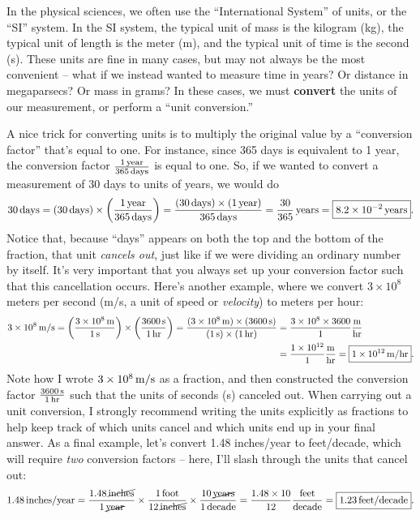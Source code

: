 \documentclass[11pt]{article}
\begin{document}
In the physical sciences, we often use the ``International System'' of units, or the ``SI'' system. In the SI system, the typical unit of mass is the kilogram (kg), the typical unit of length is the meter (m), and the typical unit of time is the second (s). These units are fine in many cases, but may not always be the most convenient -- what if we instead wanted to measure time in years? Or distance in megaparsecs? Or mass in grams? In these cases, we must \textbf{convert} the units of our measurement, or perform a ``unit conversion.''

A nice trick for converting units is to multiply the original value by a ``conversion factor'' that's equal to one. For instance, since 365 days is equivalent to 1 year, the conversion factor $\frac{1 \, {\rm year}}{365 \, {\rm days}}$ is equal to one. So, if we wanted to convert a measurement of 30 days to units of years, we would do
\medskip
\begin{equation}
    30 \, {\rm days} = (30 \, {\rm days}) \times \left(\frac{1 \, {\rm year}}{365 \, {\rm days}}\right) = \frac{(30 \, {\rm days}) \times (1 \, {\rm year})}{365 \, {\rm days}} = \frac{30}{365} \, {\rm years} = \boxed{8.2 \times 10^{-2} \, {\rm years}}.
\end{equation}
\medskip
Notice that, because ``days'' appears on both the top and the bottom of the fraction, that unit \emph{cancels out}, just like if we were dividing an ordinary number by itself. It's very important that you always set up your conversion factor such that this cancellation occurs. Here's another example, where we convert $3 \times 10^8$ meters per second (m/s, a unit of speed or \emph{velocity}) to meters per hour:
\medskip
\begin{align}
    3 \times 10^8 \, {\rm m/s} = \left(\frac{3 \times 10^8 \, {\rm m}}{1 \, {\rm s}}\right) \times \left(\frac{3600 \, {\rm s}}{1 \, {\rm hr}}\right) = \frac{(3\times 10^8 \, {\rm m}) \times (3600 \, {\rm s})}{\rm (1 \, s) \times (1 \, hr)} &= \frac{3 \times 10^8 \times 3600}{\rm 1} \frac{\rm m}{\rm hr} \nonumber \\ &= \frac{1 \times 10^{12}}{1} \frac{\rm m}{\rm hr} = \boxed{1 \times 10^{12} \, {\rm m/hr}}. 
\end{align}
\medskip 
Note how I wrote $3 \times 10^8 \, {\rm m/s}$ as a fraction, and then constructed the conversion factor $\frac{\rm 3600 \, s}{\rm 1 \, hr}$ such that the units of seconds (s) canceled out. When carrying out a unit conversion, I strongly recommend writing the units explicitly as fractions to help keep track of which units cancel and which units end up in your final answer. As a final example, let's convert 1.48 inches/year to feet/decade, which will require \emph{two} conversion factors -- here, I'll slash through the units that cancel out:
\medskip
\begin{equation}
    1.48 \, {\rm inches/year} =  \frac{1.48 \, \cancel{\mathrm{inches}}}{1 \, \cancel{\mathrm{year}}} \times \frac{1 \, \mathrm{foot}}{12 \, \cancel{\mathrm{inches}}} \times \frac{10 \, \cancel{\mathrm{years}}}{1 \, \mathrm{decade}} = \frac{1.48 \times 10}{12} \frac{\rm feet}{\rm decade}= \boxed{1.23 \, {\rm feet/decade}}.
\end{equation}
\bigskip
\end{document}
